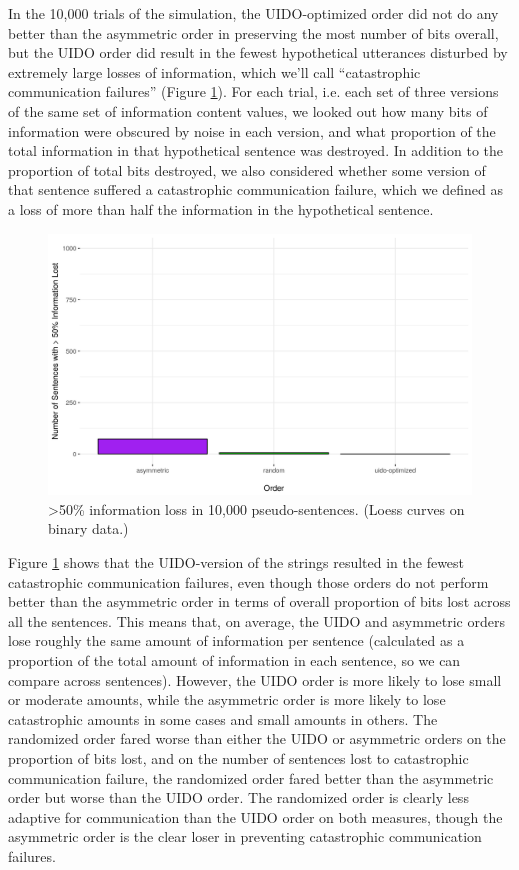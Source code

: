 \documentclass[12pt]{article}
\begin{document}
In the 10,000 trials of the simulation, the UIDO-optimized order did not do any better than the asymmetric order in preserving the most number of bits overall, but the UIDO order did result in the fewest hypothetical utterances disturbed by extremely large losses of information, which we'll call ``catastrophic communication failures'' (Figure \ref{sim}). For each trial, i.e. each set of three versions of the same set of information content values, we looked out how many bits of information were obscured by noise in each version, and what proportion of the total information in that hypothetical sentence was destroyed.  In addition to the proportion of total bits destroyed, we also considered whether some version of that sentence suffered a catastrophic communication failure, which we defined as a loss of more than half the information in the hypothetical sentence. 

\begin{figure}
	\begin{center}
\includegraphics[width=1.115\textwidth]{uid-sim-majority.png}
\caption{>50\% information loss in 10,000 pseudo-sentences. (Loess curves on binary data.)}
\label{sim}
\end{center}
\end{figure}

Figure \ref{sim} shows that the UIDO-version of the strings resulted in the fewest catastrophic communication failures, even though those orders do not perform better than the asymmetric order in terms of overall proportion of bits lost across all the sentences. This means that, on average, the UIDO and asymmetric orders lose roughly the same amount of information per sentence (calculated as a proportion of the total amount of information in each sentence, so we can compare across sentences). However, the UIDO order is more likely to lose small or moderate amounts, while the asymmetric order is more likely to lose catastrophic amounts in some cases and small amounts in others. The randomized order fared worse than either the UIDO or asymmetric orders on the proportion of bits lost, and on the number of sentences lost to catastrophic communication failure, the randomized order fared better than the asymmetric order but worse than the UIDO order. The randomized order is clearly less adaptive for communication than the UIDO order on both measures, though the asymmetric order is the clear loser in preventing catastrophic communication failures.
\end{document}
